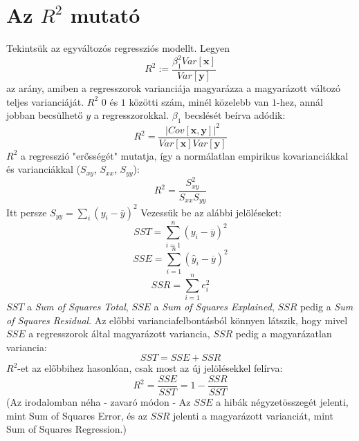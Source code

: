\documentclass[14p]{report}
\def\pmb{\boldsymbol}
\def\bar{\overline}
\newcounter{x}
\newcounter{y}
\newcounter{z}
\begin{document}
	\section{Az $R^2$ mutató}
	Tekintsük az egyváltozós regressziós modellt. Legyen
	\[
	R^2 := \frac{\beta_1^2Var[\pmb{x}]}{Var[\pmb{y}]}
	\]
	az arány, amiben a regresszorok varianciája magyarázza a magyarázott változó teljes varianciáját. $R^2$ $0$ és $1$ közötti szám, minél közelebb van $1$-hez, annál jobban becsülhető $y$ a regresszorokkal. $\beta_1$ becslését beírva adódik:
	\[
	R^2 = \frac{|Cov[\pmb{x},\pmb{y}]|^2}{Var[\pmb{x}]Var[\pmb{y}]}
	\]
	$R^2$ a regresszió "erősségét" mutatja, így a normálatlan empirikus kovarianciákkal és varianciákkal ($S_{xy}$, $S_{xx}$, $S_{yy}$):
	\[
	R^2 = \frac{S^2_{xy}}{S_{xx}S_{yy}}
	\]
	Itt persze $S_{yy} = \sum_i{(y_i - \bar{y})^2}$
	Vezessük be az alábbi jelöléseket:
	\[
	SST = \sum_{i=1}^{n}{(y_i - \bar{y})^2}
	\]
	\[
	SSE = \sum_{i=1}^{n}{(\hat{y}_i - \bar{y})^2}
	\]
	\[
	SSR = \sum_{i=1}^{n}{e_i^2}
	\]
	$SST$ a \emph{Sum of Squares Total}, $SSE$ a \emph{Sum of Squares Explained}, $SSR$ pedig a \emph{Sum of Squares Residual}. Az előbbi varianciafelbontásból könnyen látszik, hogy mivel $SSE$ a regresszorok által magyarázott variancia, $SSR$ pedig a magyarázatlan variancia:
	\[
	SST = SSE + SSR
	\]
	$R^2$-et az előbbihez hasonlóan, csak most az új jelölésekkel felírva:
	\[
	R^2 = \frac{SSE}{SST} = 1- \frac{SSR}{SST}
	\]
	(Az irodalomban néha - zavaró módon - Az $SSE$ a hibák négyzetösszegét jelenti, mint Sum of Squares Error, és az $SSR$ jelenti a magyarázott varianciát, mint Sum of Squares Regression.)
\end{document}
